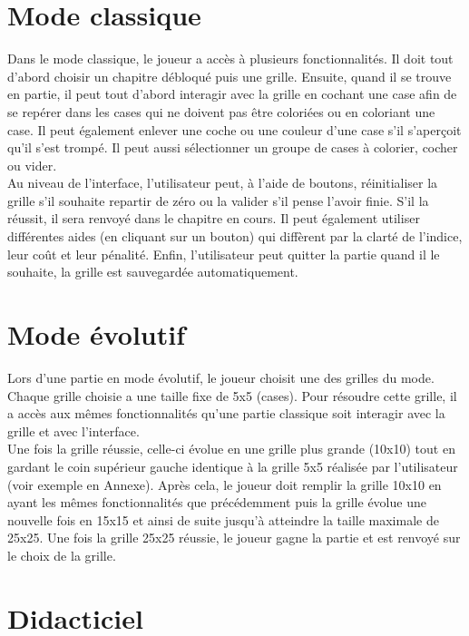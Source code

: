 \documentclass{report}
\begin{document}
	\section{Mode classique}
		Dans le mode classique, le joueur a accès à plusieurs fonctionnalités. Il doit tout d'abord choisir un chapitre débloqué puis une grille. Ensuite, quand il se trouve en partie, il peut tout d'abord interagir avec la grille en cochant une case afin de se repérer dans les cases qui ne doivent pas être coloriées ou en coloriant une case. Il peut également enlever une coche ou une couleur d'une case s'il s'aperçoit qu'il s'est trompé. Il peut aussi sélectionner un groupe de cases à colorier, cocher ou vider. \\
		Au niveau de l'interface, l'utilisateur peut, à l'aide de boutons, réinitialiser la grille s'il souhaite repartir de zéro ou la valider s'il pense l'avoir finie. S'il la réussit, il sera renvoyé dans le chapitre en cours. Il peut également utiliser différentes aides (en cliquant sur un bouton) qui diffèrent par la clarté de l'indice, leur coût et leur pénalité. Enfin, l'utilisateur peut quitter la partie quand il le souhaite, la grille est sauvegardée automatiquement.
	
	\section{Mode évolutif}
	
	Lors d'une partie en mode évolutif, le joueur choisit une des grilles du mode. Chaque grille choisie a une taille fixe de 5x5 (cases). Pour résoudre cette grille, il a accès aux mêmes fonctionnalités qu'une partie classique soit interagir avec la grille et avec l'interface. \\
Une fois la grille réussie, celle-ci évolue en une grille plus grande (10x10) tout en gardant le coin supérieur gauche identique à la grille 5x5 réalisée par l'utilisateur (voir exemple en Annexe). Après cela, le joueur doit remplir la grille 10x10 en ayant les mêmes fonctionnalités que précédemment puis la grille évolue une nouvelle fois en 15x15 et ainsi de suite jusqu'à atteindre la taille maximale de 25x25. Une fois la grille 25x25 réussie, le joueur gagne la partie et est renvoyé sur le choix de la grille.
	
	
	\section{Didacticiel}
	
\end{document}

